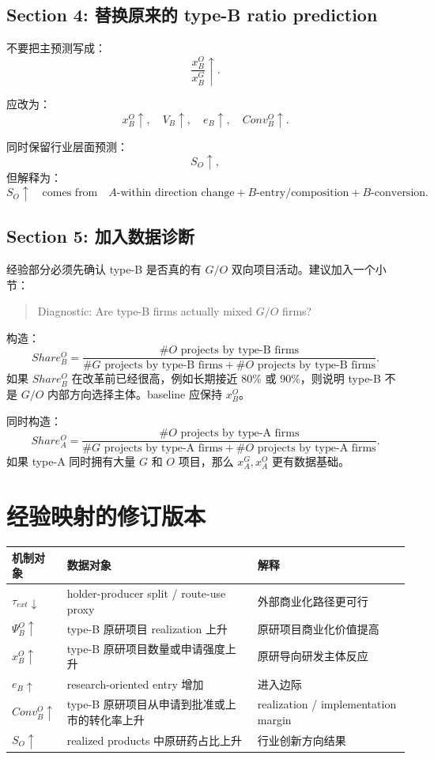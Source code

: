 \documentclass[12pt]{article}
\begin{document}
\subsection{Section 4: 替换原来的 type-B ratio prediction}

不要把主预测写成：
\[
\frac{x_B^O}{x_B^G}\uparrow.
\]

应改为：
\[
x_B^O\uparrow,
\quad
V_B\uparrow,
\quad
e_B\uparrow,
\quad
Conv_B^O\uparrow.
\]

同时保留行业层面预测：
\[
S_O\uparrow,
\]
但解释为：
\[
S_O\uparrow
\quad \text{comes from} \quad
A\text{-within direction change}
+
B\text{-entry/composition}
+
B\text{-conversion}.
\]

\subsection{Section 5: 加入数据诊断}

经验部分必须先确认 type-B 是否真的有 $G/O$ 双向项目活动。建议加入一个小节：
\begin{quote}
Diagnostic: Are type-B firms actually mixed $G/O$ firms?
\end{quote}

构造：
\[
Share_B^O
=
\frac{\# O\text{ projects by type-B firms}}
{\# G\text{ projects by type-B firms}+\# O\text{ projects by type-B firms}}.
\]
如果 $Share_B^O$ 在改革前已经很高，例如长期接近 80\% 或 90\%，则说明 type-B 不是 $G/O$ 内部方向选择主体。baseline 应保持 $x_B^O$。

同时构造：
\[
Share_A^O
=
\frac{\# O\text{ projects by type-A firms}}
{\# G\text{ projects by type-A firms}+\# O\text{ projects by type-A firms}}.
\]
如果 type-A 同时拥有大量 $G$ 和 $O$ 项目，那么 $x_A^G,x_A^O$ 更有数据基础。

\section{经验映射的修订版本}

\begin{table}[h!]
\centering
\small
\begin{tabularx}{\textwidth}{p{}p{}Y}
\toprule
机制对象 & 数据对象 & 解释 \\
\midrule
$\tau_{ext}\downarrow$ & holder-producer split / route-use proxy & 外部商业化路径更可行 \\
$\Psi_B^O\uparrow$ & type-B 原研项目 realization 上升 & 原研项目商业化价值提高 \\
$x_B^O\uparrow$ & type-B 原研项目数量或申请强度上升 & 原研导向研发主体反应 \\
$e_B\uparrow$ & research-oriented entry 增加 & 进入边际 \\
$Conv_B^O\uparrow$ & type-B 原研项目从申请到批准或上市的转化率上升 & realization / implementation margin \\
$S_O\uparrow$ & realized products 中原研药占比上升 & 行业创新方向结果 \\
\bottomrule
\end{tabularx}
\end{table}
\end{document}
